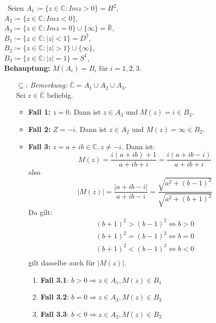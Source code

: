 \begin{solution}
  \
  Seien \( A_1 \coloneqq \{ z \in \mathbb{C}: Im z > 0 \} = H^2 \), \\
  \( A_2 \coloneqq \{ z \in \mathbb{C}: Im z < 0 \} \),\\
  \( A_3 \coloneqq \{ z \in \mathbb{C}: Im z = 0 \} \cup \{ \infty \} = \bar{\mathbb{R}} \),\\
  \( B_1 \coloneqq \{ z \in \mathbb{C} : \vert z \vert < 1\} = D^2 \), \\
  \( B_2 \coloneqq \{ z \in \mathbb{C} : \vert z \vert > 1\} \cup \{ \infty \} \),\\
  \( B_3 \coloneqq \{ z \in \mathbb{C} : \vert z \vert = 1\} = S^1 \),\\
  \textbf{Behauptung:} \( M(A_i) = B_i \) für \( i = 1, 2, 3 \).
  
  \begin{itemize}
    \item[\( \subseteq \):] \emph{Bemerkung:} \( \bar{\mathbb{C}} = A_1 \cup A_2 \cup A_3 \). \\
    Sei \( z \in \bar{\mathbb{C}} \) beliebig. \\
    \begin{itemize}
      \item \textbf{Fall 1:} \( z = 0 \). Dann ist \( z \in A_3 \) und \( M(z) = i \in B_3 \).
      \item \textbf{Fall 2:} \( Z = -i \). Dann ist \( z \in A_2 \) und \( M(z) = \infty \in B_2 \).
      \item \textbf{Fall 3:} \( z = a+ib \in \mathbb{C}, z \neq -i \). Dann ist:
      \begin{equation*}
        M(z) = \frac{i(a+ib) + 1}{a + ib + i} = \frac{i (a+ib -i)}{a + ib + i}
      \end{equation*}
      also
      \begin{equation*}
        \vert M(z) \vert = \frac{\vert a+ib-i \vert}{a+ib-i} = \frac{\sqrt{ a^2 + {(b-1)}^2}}{\sqrt{ a^2 + {(b+1)}^2}}
      \end{equation*}
      Da gilt:
      \begin{align*}
        {(b+1)}^2 > {(b-1)}^2 \Leftrightarrow b > 0 \\
        {(b+1)}^2 = {(b-1)}^2 \Leftrightarrow b = 0 \\
        {(b+1)}^2 < {(b-1)}^2 \Leftrightarrow b < 0 \\
      \end{align*}
      gilt dasselbe auch für \( \vert M(z) \vert \).
      \begin{enumerate}
        \item \textbf{Fall 3.1}: \( b > 0 \Rightarrow z \in A_1, M(z) \in B_1 \) 
        \item \textbf{Fall 3.2}: \( b = 0 \Rightarrow z \in A_3, M(z) \in B_3 \) 
        \item \textbf{Fall 3.3}: \( b < 0 \Rightarrow z \in A_2, M(z) \in B_2 \) 
      \end{enumerate}
    \end{itemize}
    

\end{itemize}
\end{solution}
